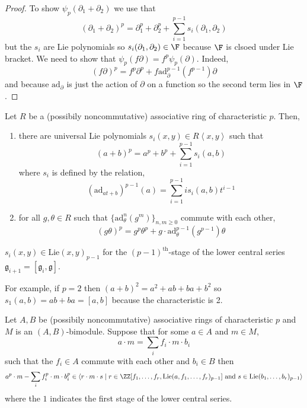 \documentclass[12pt]{article}
\newcommand{\ad}{\mathrm{ad}}
\begin{document}
\begin{proof}
To show $\psi_p(\partial_1 + \partial_2)$ we use that
\[ (\partial_1 + \partial_2)^p = \partial_1^p + \partial_2^p + \sum_{i = 1}^{p-1} s_i(\partial_1, \partial_2) \]
but the $s_i$ are Lie polynomials so $s_i(\partial_1, \partial_2) \in \F$ because $\F$ is clsoed under Lie bracket.
We need to show that $\psi_p(f \partial) = f^p \psi_p(\partial)$. Indeed, 
\[ (f \partial)^p = f^p \partial^p + f \ad_{\partial}^{p-1}(f^{p-1}) \partial \]
and because $\ad_{\partial}$ is just the action of $\partial$ on a function so the second term lies in $\F$.
\end{proof}

\newcommand{\Lie}{\mathrm{Lie}}
\newcommand{\g}{\mathfrak{g}}

\begin{lemma}
Let $R$ be a (possibily noncommutative) associative ring of characteristic $p$. Then,
\begin{enumerate}
\item there are universal Lie polynomials $s_i(x,y) \in R \left< x, y \right>$ such that
\[ (a + b)^p = a^p + b^p + \sum_{i = 1}^{p-1} s_i(a,b) \]
where $s_i$ is defined by the relation,
\[ (\ad_{a t + b})^{p-1}(a) = \sum_{i = 1}^{p-1} i s_i(a,b) t^{i-1} \]
\item for all $g, \theta \in R$ such that $\{ \ad_{\theta}^n(g^m) \}_{n,m \ge 0}$ commute with each other,
\[ (g \theta)^p = g^p \theta^p + g \cdot \ad_{\theta}^{p-1}(g^{p-1}) \theta \]
\end{enumerate}
\end{lemma}

\begin{rmk}
$s_i(x,y) \in \Lie(x,y)_{p-1}$ for the $(p-1)^{\text{th}}$-stage of the lower central series $\g_{i+1} = [\g_i, \g]$.
\end{rmk}


\begin{example}
For example, if $p = 2$ then $(a + b)^2 = a^2 + ab + ba + b^2$ so $s_1(a,b) = ab + ba = [a,b]$ because the characteristic is 2.
\end{example}


\begin{lemma}
Let $A,B$ be (possibily noncommutative) associative rings of characteristic $p$ and $M$ is an $(A,B)$-bimodule. Suppose that for some $a \in A$ and $m \in M$,
\[ a \cdot m = \sum_i f_i \cdot m \cdot b_i \]
such that the $f_i \in A$ commute with each other and $b_i \in B$ then
\[ a^p \cdot m - \sum_i f_i^p \cdot m \cdot b_i^p \in \left< r \cdot m \cdot s \mid r \in \ZZ[f_1, \dots, f_r, \Lie(a, f_1, \dots, f_r)_{p-1}] \text{ and } s \in \Lie(b_1, \dots, b_r)_{p-1} \right>  \] 
where the $1$ indicates the first stage of the lower central series.
\end{lemma}
\end{document}
